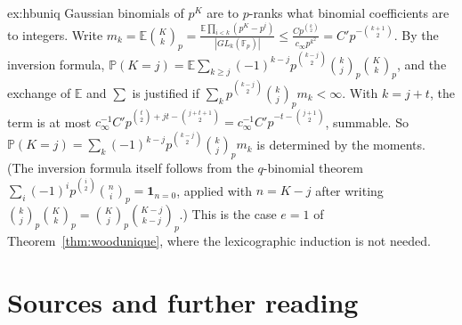 \begin{solution}{ex:hbuniq}
\idea Gaussian binomials of $p^K$ are to $p$-ranks what binomial coefficients are to integers.
\writeup Write $m_k=\mathbb E\binom Kk_p=\frac{\mathbb E\prod_{i<k}(p^K-p^i)}{|GL_k(\mathbb F_p)|}\le\frac{Cp^{\binom k2}}{c_\infty p^{k^2}}=C'p^{-\binom{k+1}2}$. By the inversion formula, $\mathbb P(K=j)=\mathbb E\sum_{k\ge j}(-1)^{k-j}p^{\binom{k-j}2}\binom kj_p\binom Kk_p$, and the exchange of $\mathbb E$ and $\sum$ is justified if $\sum_kp^{\binom{k-j}2}\binom kj_pm_k<\infty$. With $k=j+t$, the term is at most $c_\infty^{-1}C'p^{\binom t2+jt-\binom{j+t+1}2}=c_\infty^{-1}C'p^{-t-\binom{j+1}2}$, summable. So $\mathbb P(K=j)=\sum_k(-1)^{k-j}p^{\binom{k-j}2}\binom kj_pm_k$ is determined by the moments. (The inversion formula itself follows from the $q$-binomial theorem $\sum_{i}(-1)^ip^{\binom i2}\binom ni_p=\mathbf 1_{n=0}$, applied with $n=K-j$ after writing $\binom kj_p\binom Kk_p=\binom Kj_p\binom{K-j}{k-j}_p$.) This is the case $e=1$ of Theorem~\ref{thm:woodunique}, where the lexicographic induction is not needed.
\end{solution}

\section*{Sources and further reading}

